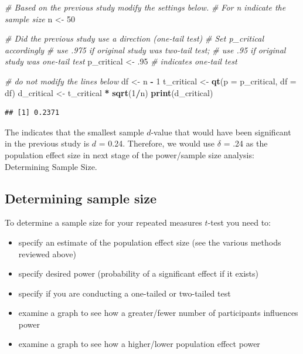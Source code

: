 \documentclass[
]{krantz}
\makeatletter
\newenvironment{Shaded}{\begin{snugshade}}{\end{snugshade}}
\newcommand{\CommentTok}[1]{\textcolor[rgb]{0.37,0.37,0.37}{\textit{#1}}}
\newcommand{\DataTypeTok}[1]{\textcolor[rgb]{0.27,0.27,0.27}{#1}}
\newcommand{\DecValTok}[1]{\textcolor[rgb]{0.06,0.06,0.06}{#1}}
\newcommand{\FloatTok}[1]{\textcolor[rgb]{0.06,0.06,0.06}{#1}}
\newcommand{\KeywordTok}[1]{\textcolor[rgb]{0.27,0.27,0.27}{\textbf{#1}}}
\newcommand{\NormalTok}[1]{#1}
\newcommand{\OperatorTok}[1]{\textcolor[rgb]{0.43,0.43,0.43}{\textbf{#1}}}
\newcommand{\StringTok}[1]{\textcolor[rgb]{0.5,0.5,0.5}{#1}}
\newenvironment{kframe}{%
\medskip{}
\setlength{\fboxsep}{.8em}
 \def\at@end@of@kframe{}%
 \ifinner\ifhmode%
  \def\at@end@of@kframe{\end{minipage}}%
  \begin{minipage}{\columnwidth}%
 \fi\fi%
 \def\FrameCommand##1{\hskip\@totalleftmargin \hskip-\fboxsep
 \colorbox{shadecolor}{##1}\hskip-\fboxsep
     \hskip-\linewidth \hskip-\@totalleftmargin \hskip\columnwidth}%
 \MakeFramed {\advance\hsize-\width
   \@totalleftmargin\z@ \linewidth\hsize
   \@setminipage}}%
 {\par\unskip\endMakeFramed%
 \at@end@of@kframe}
\renewenvironment{Shaded}{\begin{kframe}}{\end{kframe}}
\makeatother
\begin{document}
\begin{Shaded}
\begin{Highlighting}[]
\CommentTok{# Based on the previous study modify the settings below.}
\CommentTok{# For n indicate the sample size}
\NormalTok{n <-}\StringTok{ }\DecValTok{50}

\CommentTok{# Did the previous study use a direction (one-tail test)}
\CommentTok{# Set p_critical accordingly}
\CommentTok{# use .975 if original study was two-tail test;}
\CommentTok{# use .95 if original study was one-tail test}
\NormalTok{p_critical <-}\StringTok{ }\FloatTok{.95} \CommentTok{# indicates one-tail test}

\CommentTok{# do not modify the lines below}
\NormalTok{df <-}\StringTok{ }\NormalTok{n }\OperatorTok{-}\StringTok{ }\DecValTok{1}
\NormalTok{t_critical <-}\StringTok{ }\KeywordTok{qt}\NormalTok{(}\DataTypeTok{p =}\NormalTok{ p_critical, }\DataTypeTok{df =}\NormalTok{ df) }
\NormalTok{d_critical <-}\StringTok{ }\NormalTok{t_critical }\OperatorTok{*}\StringTok{ }\KeywordTok{sqrt}\NormalTok{(}\DecValTok{1}\OperatorTok{/}\NormalTok{n)}
\KeywordTok{print}\NormalTok{(d_critical)}
\end{Highlighting}
\end{Shaded}

\begin{verbatim}
## [1] 0.2371
\end{verbatim}

The indicates that the smallest sample \(d\)-value that would have been significant in the previous study is \(d\) = 0.24. Therefore, we would use \(\delta\) = .24 as the population effect size in next stage of the power/sample size analysis: Determining Sample Size.

\hypertarget{determining-sample-size-1}{%
\subsection{Determining sample size}\label{determining-sample-size-1}}

To determine a sample size for your repeated measures \(t\)-test you need to:

\begin{itemize}
\item
  specify an estimate of the population effect size (see the various methods reviewed above)
\item
  specify desired power (probability of a significant effect if it exists)
\item
  specify if you are conducting a one-tailed or two-tailed test
\item
  examine a graph to see how a greater/fewer number of participants influences power
\item
  examine a graph to see how a higher/lower population effect power
\end{itemize}
\end{document}
